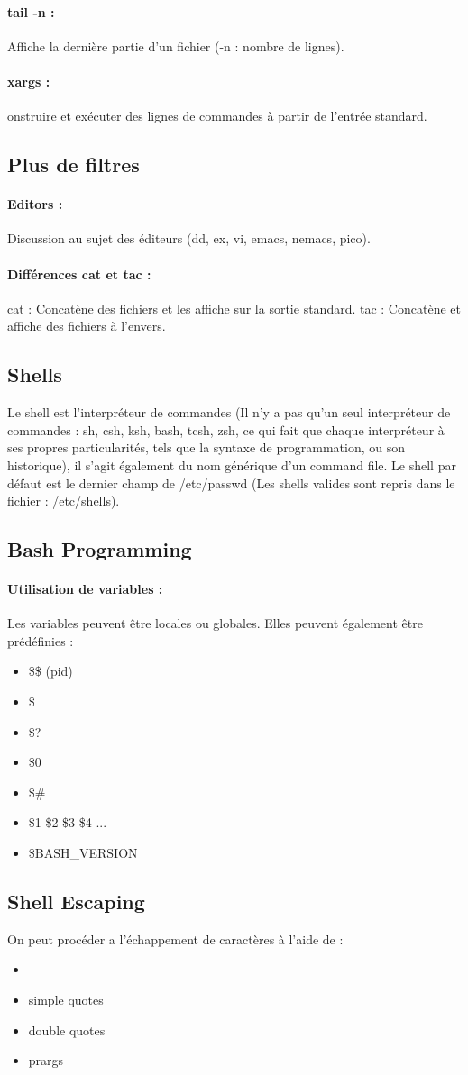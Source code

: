 \documentclass{article}[12pt]
\begin{document}
\paragraph{tail -n : } Affiche la dernière partie d'un fichier (-n : nombre de lignes).
\paragraph{xargs : } onstruire et exécuter des lignes de commandes à partir de l'entrée standard.
\subsection{Plus de filtres}
\paragraph{Editors : } Discussion au sujet des éditeurs (dd, ex, vi, emacs, nemacs, pico). 
\paragraph{Différences cat et tac : } cat : Concatène des fichiers et les affiche sur la sortie standard. tac : Concatène et affiche des fichiers à l'envers.
\subsection{Shells}
Le shell est l'interpréteur de commandes (Il n'y a pas qu'un seul interpréteur de commandes : sh, csh, ksh, bash, tcsh, zsh, ce qui fait que chaque interpréteur à ses propres particularités, tels que la syntaxe de programmation, ou son historique), il s'agit également du nom générique d'un command file. Le shell par défaut est le dernier champ de /etc/passwd (Les shells valides sont repris dans le fichier : /etc/shells).
\subsection{Bash Programming}
\paragraph{Utilisation de variables : } Les variables peuvent être locales ou globales. Elles peuvent également être prédéfinies : 
\begin{itemize}
\item \$\$ (pid)
\item \$\*
\item \$?
\item \$0
\item \$\#
\item \$1 \$2 \$3 \$4 ...
\item \$BASH\_VERSION
\end{itemize}
\subsection{Shell Escaping}
On peut procéder a l’échappement de caractères à l'aide de : 
\begin{itemize}
\item \/
\item simple quotes
\item double quotes
\item prargs
\end{itemize}
\end{document}
